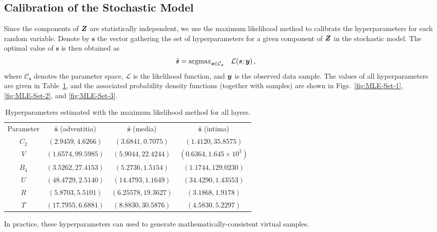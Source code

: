 \subsection{Calibration of the Stochastic Model} \label{subsec:sto-calibration}

Since the components of $\boldsymbol{Z}$ are statistically independent, we use the maximum likelihood method to calibrate the hyperparameters for each random variable. Denote by $\boldsymbol{s}$ the vector gathering the set of hyperparameters for a given component of $\boldsymbol{Z}$ in the stochastic model. The optimal value of $\boldsymbol{s}$ is then obtained as
\begin{align}
    \hat{\boldsymbol{s}} &= \text{argmax}_{\boldsymbol{s} \in \mathcal{C}_{\boldsymbol{s}}} \quad \mathcal{L}(\boldsymbol{s}; \boldsymbol{y})\,,
\end{align}
where $\mathcal{C}_{\boldsymbol{s}}$ denotes the parameter space, $\mathcal{L}$ is the likelihood function, and $\boldsymbol{y}$ is the observed data sample. The values of all hyperparameters are given in Table~\ref{tab:hyperparameters}, and the associated probability density functions (together with samples) are shown in Figs.~\ref{fig:MLE-Set-1}, \ref{fig:MLE-Set-2}, and \ref{fig:MLE-Set-3}.
\begin{table}[ht!]
\caption[Hyperparameters estimated with the maximum likelihood method.]{Hyperparameters estimated with the maximum likelihood method for all layers.}
\label{tab:hyperparameters}
\begin{center}
    \begin{tabular}{|c|c|c|c|} 
 \hline
 \quad Parameter \quad & \quad $\hat{\boldsymbol{s}}$ (adventitia) \quad & \quad $\hat{\boldsymbol{s}}$ (media) \quad & \quad $\hat{\boldsymbol{s}}$ (intima) \quad \\
 \cline{1-4} 
    $C_2$ & $(2.9459, 4.6266)$  & $(3.6841, 0.7075)$   & $(1.4120, 35.8575)$\\
    $V$   & $(1.6574, 99.5985)$ & $(5.9044, 22.4244)$  & $(0.6364, 1.645 \times 10^3)$\\
    $B_4$ & $(3.5262, 27.4153)$ & $(5.2736, 1.5154)$   & $(1.1744, 129.0230)$\\
    $U$   & $(48.4729, 2.5140)$ & $(14.4793, 1.1649)$  & $(34.4290, 1.43553)$\\
    $R$   & $(5.8703, 5.5101)$  & $(6.25578, 19.3627)$ & $(3.1868, 1.9178)$\\
    $T$   & $(17.7955, 6.6881)$ & $(8.8830, 30.5876)$  & $(4.5830, 5.2297)$\\
 \hline 
\end{tabular}
\end{center}
\end{table}
In practice, these hyperparameters can used to generate mathematically-consistent virtual samples. 

